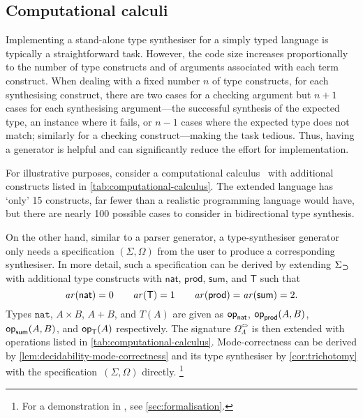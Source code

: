 \subsection{Computational calculi}\label{subsec:PCF}
Implementing a stand-alone type synthesiser for a simply typed language is typically a straightforward task.
However, the code size increases proportionally to the number of type constructs and of arguments associated with each term construct.
When dealing with a fixed number $n$ of type constructs, for each synthesising construct, there are two cases for a checking argument but $n + 1$ cases for each synthesising argument---the successful synthesis of the expected type, an instance where it fails, or $n-1$ cases where the expected type does not match; similarly for a checking construct---making the task tedious.
Thus, having a generator is helpful and can significantly reduce the effort for implementation.

For illustrative purposes, consider a computational calculus~\cite{Moggi1989} with additional constructs listed in \cref{tab:computational-calculus}.
The extended language has `only' 15 constructs, far fewer than a realistic programming language would have, but there are nearly 100 possible cases to consider in bidirectional type synthesis.

On the other hand, similar to a parser generator, a type-synthesiser generator only needs a specification $(\Sigma, \Omega)$ from the user to produce a corresponding synthesiser. 
In more detail, such a specification can be derived by extending $\Sigma_{\mathbin{\bm{\supset}}}$ with additional type constructs with $\mathsf{nat}$, $\mathsf{prod}$, $\mathsf{sum}$, and $\mathsf{T}$ such that
\[
  \mathit{ar}({\mathsf{nat}}) = 0\qquad
  \mathit{ar}({\mathsf{T}}) = 1\qquad
  \mathit{ar}({\mathsf{prod}}) = \mathit{ar}({\mathsf{sum}}) = 2.
\]
Types $\mathtt{nat}$, $A \times B$, $A + B$, and $T(A)$ are given as $\mathsf{op}_{\mathsf{nat}}$, $\mathsf{op}_{\mathsf{prod}}(A, B)$, $\mathsf{op}_{\mathsf{sum}}(A, B)$, and $\mathsf{op}_{\mathsf{T}}(A)$ respectively.
The signature $\Omega_{\Lambda}^{\Leftrightarrow}$ is then extended with operations listed in \cref{tab:computational-calculus}.
Mode-correctness can be derived by \cref{lem:decidability-mode-correctness} and its type synthesiser by \cref{cor:trichotomy} with the specification~$(\Sigma, \Omega)$ directly.%
\footnote{For a demonstration in \Agda, see \cref{sec:formalisation}.}

